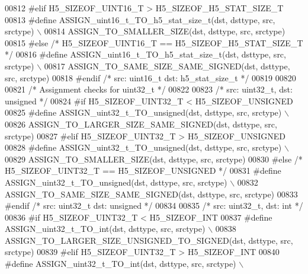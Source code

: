 \begin{DoxyCode}
00812 \textcolor{preprocessor}{#elif H5\_SIZEOF\_UINT16\_T > H5\_SIZEOF\_H5\_STAT\_SIZE\_T}
00813 \textcolor{preprocessor}{    #define ASSIGN\_uint16\_t\_TO\_h5\_stat\_size\_t(dst, dsttype, src, srctype) \(\backslash\)}
00814 \textcolor{preprocessor}{        ASSIGN\_TO\_SMALLER\_SIZE(dst, dsttype, src, srctype)}
00815 \textcolor{preprocessor}{#else }\textcolor{comment}{/* H5\_SIZEOF\_UINT16\_T == H5\_SIZEOF\_H5\_STAT\_SIZE\_T */}\textcolor{preprocessor}{}
00816 \textcolor{preprocessor}{    #define ASSIGN\_uint16\_t\_TO\_h5\_stat\_size\_t(dst, dsttype, src, srctype) \(\backslash\)}
00817 \textcolor{preprocessor}{        ASSIGN\_TO\_SAME\_SIZE\_SAME\_SIGNED(dst, dsttype, src, srctype)}
00818 \textcolor{preprocessor}{#endif }\textcolor{comment}{/* src: uint16\_t dst: h5\_stat\_size\_t */}\textcolor{preprocessor}{}
00819 
00820 
00821 \textcolor{comment}{/* Assignment checks for uint32\_t */}
00822 
00823 \textcolor{comment}{/* src: uint32\_t, dst: unsigned */}
00824 \textcolor{preprocessor}{#if H5\_SIZEOF\_UINT32\_T < H5\_SIZEOF\_UNSIGNED}
00825 \textcolor{preprocessor}{    #define ASSIGN\_uint32\_t\_TO\_unsigned(dst, dsttype, src, srctype) \(\backslash\)}
00826 \textcolor{preprocessor}{        ASSIGN\_TO\_LARGER\_SIZE\_SAME\_SIGNED(dst, dsttype, src, srctype)}
00827 \textcolor{preprocessor}{#elif H5\_SIZEOF\_UINT32\_T > H5\_SIZEOF\_UNSIGNED}
00828 \textcolor{preprocessor}{    #define ASSIGN\_uint32\_t\_TO\_unsigned(dst, dsttype, src, srctype) \(\backslash\)}
00829 \textcolor{preprocessor}{        ASSIGN\_TO\_SMALLER\_SIZE(dst, dsttype, src, srctype)}
00830 \textcolor{preprocessor}{#else }\textcolor{comment}{/* H5\_SIZEOF\_UINT32\_T == H5\_SIZEOF\_UNSIGNED */}\textcolor{preprocessor}{}
00831 \textcolor{preprocessor}{    #define ASSIGN\_uint32\_t\_TO\_unsigned(dst, dsttype, src, srctype) \(\backslash\)}
00832 \textcolor{preprocessor}{        ASSIGN\_TO\_SAME\_SIZE\_SAME\_SIGNED(dst, dsttype, src, srctype)}
00833 \textcolor{preprocessor}{#endif }\textcolor{comment}{/* src: uint32\_t dst: unsigned */}\textcolor{preprocessor}{}
00834 
00835 \textcolor{comment}{/* src: uint32\_t, dst: int */}
00836 \textcolor{preprocessor}{#if H5\_SIZEOF\_UINT32\_T < H5\_SIZEOF\_INT}
00837 \textcolor{preprocessor}{    #define ASSIGN\_uint32\_t\_TO\_int(dst, dsttype, src, srctype) \(\backslash\)}
00838 \textcolor{preprocessor}{        ASSIGN\_TO\_LARGER\_SIZE\_UNSIGNED\_TO\_SIGNED(dst, dsttype, src, srctype)}
00839 \textcolor{preprocessor}{#elif H5\_SIZEOF\_UINT32\_T > H5\_SIZEOF\_INT}
00840 \textcolor{preprocessor}{    #define ASSIGN\_uint32\_t\_TO\_int(dst, dsttype, src, srctype) \(\backslash\)}

\end{DoxyCode}
